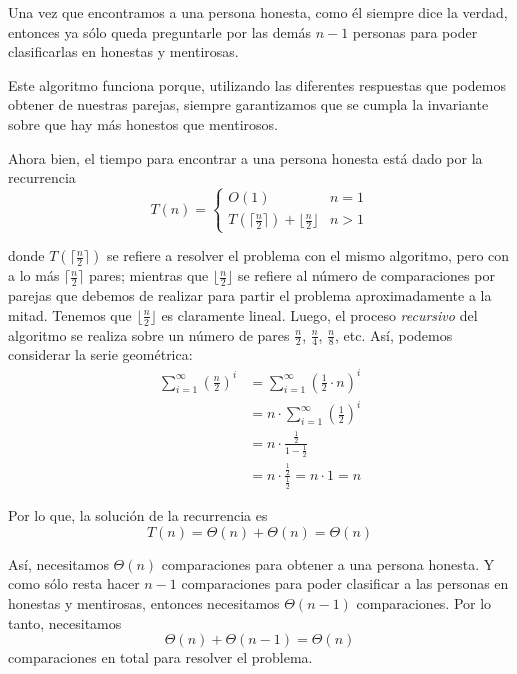 \documentclass[letterpaper,11pt]{article}
\begin{document}
\begin{enumerate}
    Una vez que encontramos a una persona honesta, como él siempre dice la 
    verdad, entonces ya sólo queda preguntarle por las demás $n-1$ personas 
    para poder clasificarlas en honestas y mentirosas. 

    Este algoritmo funciona porque, utilizando las diferentes respuestas que 
    podemos obtener de nuestras parejas, siempre garantizamos que se cumpla 
    la invariante sobre que hay más honestos que mentirosos. 

    Ahora bien, el tiempo para encontrar a una persona honesta está dado por 
    la recurrencia
    \begin{equation*}
        T(n) =
        \left\{
            \begin{array}{ll}
                O(1)  & n = 1 \\
                T(\lceil \frac{n}{2} \rceil) + \lfloor \frac{n}{2} \rfloor & 
                n > 1
            \end{array}
        \right.
    \end{equation*}

    donde $T(\lceil \frac{n}{2} \rceil)$ se refiere a resolver el problema con 
    el mismo algoritmo, pero con a lo más $\lceil \frac{n}{2} \rceil$ pares; 
    mientras que $\lfloor \frac{n}{2} \rfloor$ se refiere al número de 
    comparaciones por parejas que debemos de realizar para partir el problema 
    aproximadamente a la mitad. Tenemos que $\lfloor \frac{n}{2} \rfloor$ es 
    claramente lineal. Luego, el proceso \textit{recursivo} del algoritmo 
    se realiza sobre un número de pares $\frac{n}{2}$, $\frac{n}{4}$, 
    $\frac{n}{8}$, etc. Así, podemos considerar la serie geométrica:
    \begin{align*}
        \sum_{i=1}^{\infty} \left(\frac{n}{2} \right)^i 
        &= \sum_{i=1}^{\infty} \left(\frac{1}{2} \cdot n \right)^i \\
        &= n \cdot \sum_{i=1}^{\infty} \left(\frac{1}{2}\right)^i \\
        &= n \cdot \frac{\frac{1}{2}}{1 - \frac{1}{2}} \\
        &= n \cdot \frac{\frac{1}{2}}{\frac{1}{2}} = n \cdot 1 = n 
    \end{align*}

    Por lo que, la solución de la recurrencia es 
    \begin{equation*}
        T(n) = \Theta(n) + \Theta(n) = \Theta(n) 
    \end{equation*}

    Así, necesitamos $\Theta(n)$ comparaciones para obtener a una persona 
    honesta. Y como sólo resta hacer $n-1$ comparaciones para poder clasificar 
    a las personas en honestas y mentirosas, entonces necesitamos $\Theta(n-1)$
    comparaciones. Por lo tanto, necesitamos 
    \begin{equation*}
        \Theta(n) + \Theta(n-1) = \Theta(n)
    \end{equation*} 
    comparaciones en total para resolver el problema. 


\end{enumerate}
\end{document}
